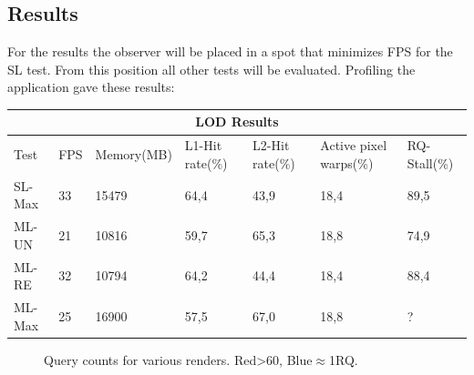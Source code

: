 \subsection{Results}
For the results the observer will be placed in a spot that minimizes FPS for the SL test. From this position all other tests will be evaluated. Profiling the application gave these results:
\begin{center}
    \small{
\begin{tabular}{ |p{1.8cm}||p{0.7cm}|p{2.05cm}|p{1.8cm}|p{1.8cm}|p{2cm}|p{1.2cm}|  }
 \hline
 \multicolumn{7}{|c|}{LOD Results} \\
 \hline
 Test & FPS & Memory(MB) & L1-Hit rate(\%) & L2-Hit rate(\%) & Active pixel warps(\%) & RQ-Stall(\%)\\
 \hline
 SL-Max &   33  &   15479   &   64,4    &   43,9    &   18,4    &   89,5\\
 \hline
 ML-UN  &   21  &   10816   &   59,7    &   65,3    &   18,8    &   74,9\\
\hline
 ML-RE  &   32  &   10794   &   64,2    &   44,4    &   18,4    &   88,4\\
\hline
 ML-Max &   25  &   16900   &   57,5    &   67,0    &   18,8    &   ?\\
\hline
\end{tabular}
}
\end{center}
\newpage
\begin{figure}
\hfill
{}
\hfill
{}
\hfill
{}
\hfill
\caption{Query counts for various renders. Red>60, Blue$\approx$1RQ.}
\label{fig:MoanaQueryCount}
\end{figure}
